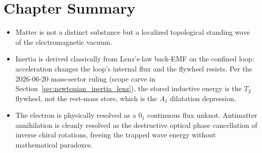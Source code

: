\section*{Chapter Summary}
\begin{itemize}
    \item Matter is not a distinct substance but a localized topological standing wave of the electromagnetic vacuum.
    \item Inertia is derived classically from Lenz's-law back-EMF on the confined loop: acceleration changes the loop's internal flux and the flywheel resists. Per the 2026-06-20 mass-sector ruling (scope carve in Section~\ref{sec:newtonian_inertia_lenz}), the stored inductive energy is the $T_2$ flywheel, not the rest-mass store, which is the $A_1$ dilatation depression.
    \item The electron is physically resolved as a $0_1$ continuous flux unknot. Antimatter annihilation is cleanly resolved as the destructive optical phase cancellation of inverse chiral rotations, freeing the trapped wave energy without mathematical paradoxes.
\end{itemize}

